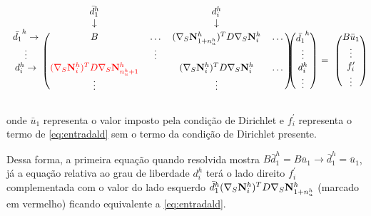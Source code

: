 \begin{equation} \label{eq:bigconst}
\begin{blockarray}{ccccc}
& \bar{d}_1^h &  & d_i ^h & & \\
& \downarrow &  & \downarrow & & \\
\begin{block}{c(cccc)}
\bar{d_1}^h \rightarrow & B & \hdots &  \kij{1+\qtdfreedomfine}{i}  & \hdots \\
\vdots                  &   & \vdots &             \\
d_i^h       \rightarrow &{ \color{red}\kij{i}{n_u^h + 1} }  &      & \kij{i}{i}   & \hdots \\
& \vdots &      & \vdots   &  \\
\end{block}
\end{blockarray} \begin{blockarray}{c}
 \\
 \\
\begin{block}{(c)}
\bar{d_1}^h \\
\vdots\\
d_i^h \\
\vdots  \\
\end{block}
\end{blockarray}\begin{blockarray}{c}
 \\
 \\
 \\
= \\
 \\
\end{blockarray} \begin{blockarray}{c}
 \\
 \\
\begin{block}{(c)}
 B \bar{u}_1 \\
\vdots\\
f^\prime_i \\
\vdots  \\
\end{block}
\end{blockarray}
\end{equation}


onde $\bar{u}_1$ representa o valor imposto pela condição de Dirichlet e $f^\prime_i$ representa o termo de \ref{eq:entradald} sem o termo da condição de Dirichlet presente.

Dessa forma, a primeira equação quando resolvida mostra $B\bar{d}_1^h = B\bar{u}_1 \rightarrow \bar{d}_1^h = \bar{u}_1$, já a equação relativa ao grau de liberdade $d_i^h$ terá o lado direito $f^\prime_i$ complementada com o valor do lado esquerdo $\bar{d}_1^h (\nabla_S {\mathbf{N}_{i}^h})^T D \nabla_S {\mathbf{N}_{1+n_u^h}^h}$ (marcado em vermelho) ficando equivalente a \eqref{eq:entradald}.

